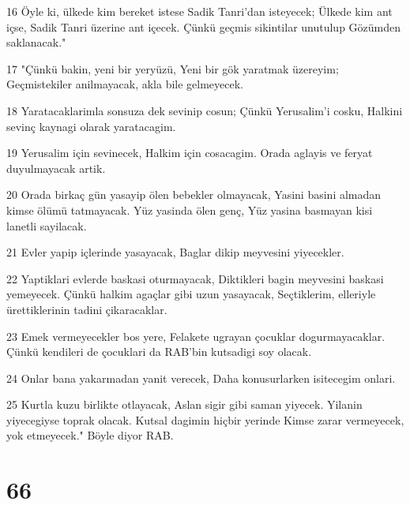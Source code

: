 \par 16 Öyle ki, ülkede kim bereket istese Sadik Tanri'dan isteyecek; Ülkede kim ant içse, Sadik Tanri üzerine ant içecek. Çünkü geçmis sikintilar unutulup Gözümden saklanacak."
\par 17 "Çünkü bakin, yeni bir yeryüzü, Yeni bir gök yaratmak üzereyim; Geçmistekiler anilmayacak, akla bile gelmeyecek.
\par 18 Yaratacaklarimla sonsuza dek sevinip cosun; Çünkü Yerusalim'i cosku, Halkini sevinç kaynagi olarak yaratacagim.
\par 19 Yerusalim için sevinecek, Halkim için cosacagim. Orada aglayis ve feryat duyulmayacak artik.
\par 20 Orada birkaç gün yasayip ölen bebekler olmayacak, Yasini basini almadan kimse ölümü tatmayacak. Yüz yasinda ölen genç, Yüz yasina basmayan kisi lanetli sayilacak.
\par 21 Evler yapip içlerinde yasayacak, Baglar dikip meyvesini yiyecekler.
\par 22 Yaptiklari evlerde baskasi oturmayacak, Diktikleri bagin meyvesini baskasi yemeyecek. Çünkü halkim agaçlar gibi uzun yasayacak, Seçtiklerim, elleriyle ürettiklerinin tadini çikaracaklar.
\par 23 Emek vermeyecekler bos yere, Felakete ugrayan çocuklar dogurmayacaklar. Çünkü kendileri de çocuklari da RAB'bin kutsadigi soy olacak.
\par 24 Onlar bana yakarmadan yanit verecek, Daha konusurlarken isitecegim onlari.
\par 25 Kurtla kuzu birlikte otlayacak, Aslan sigir gibi saman yiyecek. Yilanin yiyecegiyse toprak olacak. Kutsal dagimin hiçbir yerinde Kimse zarar vermeyecek, yok etmeyecek." Böyle diyor RAB.

\chapter{66}

